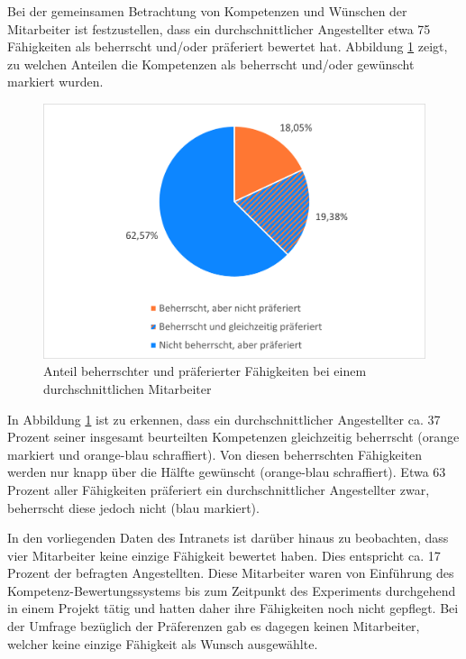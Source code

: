 Bei der gemeinsamen Betrachtung von Kompetenzen und Wünschen der Mitarbeiter ist festzustellen, dass ein durchschnittlicher Angestellter etwa 75 Fähigkeiten als beherrscht und/oder präferiert bewertet hat. Abbildung \ref{fig:ergebnisse:analyse:abb3} zeigt, zu welchen Anteilen die Kompetenzen als beherrscht und/oder gewünscht markiert wurden.

\begin{figure}[h]
	\centering
	\includegraphics[width=1\textwidth]{gfx/auswertung-anteil-an-faehigkeiten.png}
	\caption{Anteil beherrschter und präferierter Fähigkeiten bei einem durchschnittlichen Mitarbeiter}
	\label{fig:ergebnisse:analyse:abb3}
\end{figure}

In Abbildung \ref{fig:ergebnisse:analyse:abb3} ist zu erkennen, dass ein durchschnittlicher Angestellter ca. 37 Prozent seiner insgesamt beurteilten Kompetenzen gleichzeitig beherrscht (orange markiert und orange-blau schraffiert). Von diesen beherrschten Fähigkeiten werden nur knapp über die Hälfte gewünscht (orange-blau schraffiert). Etwa 63 Prozent aller Fähigkeiten präferiert ein durchschnittlicher Angestellter zwar, beherrscht diese jedoch nicht (blau markiert).

In den vorliegenden Daten des Intranets ist darüber hinaus zu beobachten, dass vier Mitarbeiter keine einzige Fähigkeit bewertet haben. Dies entspricht ca. 17 Prozent der befragten Angestellten. Diese Mitarbeiter waren von Einführung des Kompetenz-Bewertungssystems bis zum Zeitpunkt des Experiments durchgehend in einem Projekt tätig und hatten daher ihre Fähigkeiten noch nicht gepflegt. Bei der Umfrage bezüglich der Präferenzen gab es dagegen keinen Mitarbeiter, welcher keine einzige Fähigkeit als Wunsch ausgewählte.
\newpage
